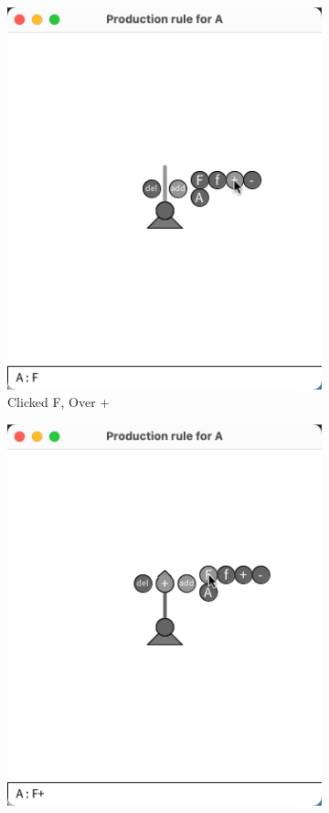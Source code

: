 \documentclass[12pt,twoside]{reedthesis}
\begin{document}
\begin{figure}[H]
\begin{subfigure}{0.25\textwidth}
		\includegraphics[trim={5cm 6cm 2cm 4cm}, clip, width=\textwidth]{Images/HowToExplore1B}
		\caption{Clicked F, Over +}
		\label {HowToExplore1B}
	\end{subfigure}%
	\begin{subfigure}{0.25\textwidth}
		\centering
		\includegraphics[trim={5cm 6cm 2cm 4cm}, clip, width=\textwidth]{Images/HowToExplore1C}

\end{subfigure}
\end{figure}
\end{document}
